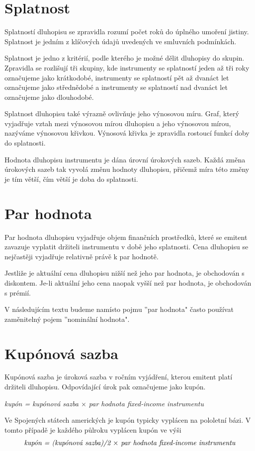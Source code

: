 \documentclass[a4paper]{book}
\begin{document}
\section{Splatnost}

Splatností dluhopisu se zpravidla rozumí počet roků do úplného umoření jistiny. Splatnost je jedním z klíčových údajů uvedených ve smluvních podmínkách. 

Splatnost je jedno z kritérií, podle kterého je možné dělit dluhopisy do skupin. Zpravidla se rozlišují tři skupiny, kde instrumenty se splatností jeden až tři roky označujeme jako krátkodobé, instrumenty se splatností pět až dvanáct let označujeme jako střednědobé a instrumenty se splatností nad dvanáct let označujeme jako dlouhodobé.

Splatnost dluhopisu také výrazně ovlivňuje jeho výnosovou míru. Graf, který vyjadřuje vztah mezi výnosovou mírou dluhopisu a jeho výnosovou mírou, nazýváme výnosovou křivkou. Výnosová křivka je zpravidla rostoucí funkcí doby do splatnosti.

Hodnota dluhopisu instrumentu je dána úrovní úrokových sazeb. Každá změna úrokových sazeb tak vyvolá změnu hodnoty dluhopisu, přičemž míra této změny je tím větší, čím větší je doba do splatnosti.

\section{Par hodnota}

Par hodnota dluhopisu vyjadřuje objem finančních prostředků, které se emitent zavazuje vyplatit držiteli instrumentu v době jeho splatnosti. Cena dluhopisu se nejčastěji vyjadřuje relativně právě k par hodnotě.

Jestliže je aktuální cena dluhopisu nižší než jeho par hodnota, je obchodován s diskontem. Je-li aktuální jeho cena naopak vyšší než par hodnota, je obchodován s prémií.

V následujícím textu budeme namísto pojmu ''par hodnota" často používat zaměnitelný pojem ''nominální hodnota".

\section{Kupónová sazba}

Kupónová sazba je úroková sazba v ročním vyjádření, kterou emitent platí držiteli dluhopisu. Odpovídající úrok pak označujeme jako kupón.
\begin{center}
\textit{kupón = kupónová sazba $\times$ par hodnota fixed-income instrumentu}
\end{center}
Ve Spojených státech amerických je kupón typicky vyplácen na pololetní bázi. V tomto případě je každého půlroku vyplácen kupón ve výši
\begin{equation*}
\textit{kupón = (kupónová sazba)\//2 $\times$ par hodnota fixed-income instrumentu}
\end{equation*}
\end{document}
